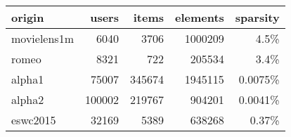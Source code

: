 \begin{table}
\centering
\begin{tabular}{| l | r | r | r | r |}
    \hline
    origin      &   users   & items     & elements  & sparsity  \\ \hline

    movielens1m &   6040    & 3706      & 1000209   & 4.5\%     \\ \hline
    romeo       &   8321    & 722       & 205534    & 3.4\%     \\ \hline
    alpha1      &   75007   & 345674    & 1945115   & 0.0075\%  \\ \hline
    alpha2      &   100002  & 219767    & 904201    & 0.0041\%  \\ \hline
    eswc2015    &   32169   & 5389      & 638268    & 0.37\%    \\ \hline

\end{tabular}
\end{table}

